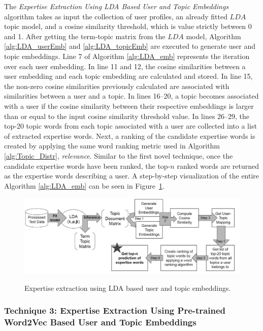             The \emph{Expertise Extraction Using LDA Based User and Topic Embeddings} algorithm takes as input the collection of user profiles, an already fitted $LDA$ topic model, and a cosine similarity threshold, which is value strictly between 0 and 1. After getting the term-topic matrix from the $LDA$ model, Algorithm \ref{alg:LDA_userEmb} and \ref{alg:LDA_topicEmb} are executed to generate user and topic embeddings. Line 7 of Algorithm \ref{alg:LDA_emb} represents the iteration over each user embedding. In line 11 and 12, the cosine similarities between a user embedding and each topic embedding are calculated and stored. In line 15, the non-zero cosine similarities previously calculated are associated with similarities between a user and a topic. In lines 16--20, a topic becomes associated with a user if the cosine similarity between their respective embeddings is larger than or equal to the input cosine similarity threshold value. In lines 26--29, the top-20 topic words from each topic associated with a user are collected into a list of extracted expertise words. Next, a ranking of the candidate expertise words is created by applying the same word ranking metric used in Algorithm \ref{alg:Topic_Distr}, \emph{relevance}. Similar to the first novel technique, once the candidate expertise words have been ranked, the top-$n$ ranked words are returned as the expertise words describing a user. A step-by-step visualization of the entire Algorithm \ref{alg:LDA_emb} can be seen in Figure~\ref{fig:technique2}.
             
            \begin{figure}[!ht]
              \centering
              \includegraphics[width=\textwidth]{figures/technique2.JPG}\\
              \caption{Expertise extraction using LDA based user and topic embeddings.}
              \label{fig:technique2}
            \end{figure}
            
        \subsubsection{Technique 3: Expertise Extraction Using Pre-trained Word2Vec Based User and Topic Embeddings}\label{word2vec_model}
        
